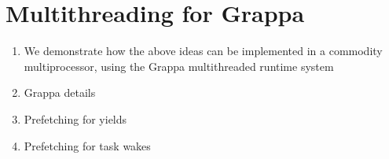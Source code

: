 \section{Multithreading for Grappa}

\begin{enumerate}
\item We demonstrate how the above ideas can be implemented in a commodity multiprocessor, using the Grappa multithreaded runtime system
\item Grappa details
\item Prefetching for yields
\item Prefetching for task wakes
\end{enumerate}
